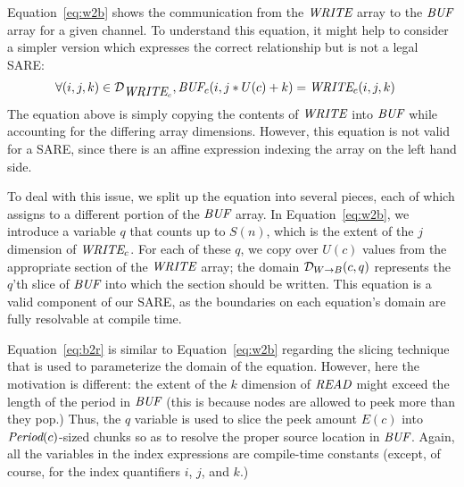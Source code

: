 Equation~\ref{eq:w2b} shows the communication from the $\mbox{\it WRITE}$
array to the $\mbox{\it BUF}$ array for a given channel.  To understand this
equation, it might help to consider a simpler version which expresses
the correct relationship but is not a legal SARE:
\begin{align*}
&\forall (i,j,k) \in {\cal D}_{\mbox{\it WRITE}_c},
\mbox{\it BUF}_{c}(i,j*U(c)+k) = \mbox{\it WRITE}_{c}(i, j, k)
\end{align*}
The equation above is simply copying the contents of $\mbox{\it WRITE}$ into
$\mbox{\it BUF}$ while accounting for the differing array dimensions.
However, this equation is not valid for a SARE, since there is an
affine expression indexing the array on the left hand side.

To deal with this issue, we split up the equation into several pieces,
each of which assigns to a different portion of the $\mbox{\it BUF}$ array.
In Equation~\ref{eq:w2b}, we introduce a variable $q$ that counts up
to $S(n)$, which is the extent of the $j$ dimension of $\mbox{\it WRITE}_c$.
For each of these $q$, we copy over $U(c)$ values from the appropriate
section of the $\mbox{\it WRITE}$ array; the domain ${\cal D}_{W \rightarrow
B}(c,q)$ represents the $q$'th slice of $\mbox{\it BUF}$ into which the
section should be written.  This equation is a valid component of our
SARE, as the boundaries on each equation's domain are fully resolvable
at compile time.

Equation~\ref{eq:b2r} is similar to Equation~\ref{eq:w2b} regarding
the slicing technique that is used to parameterize the domain of the
equation.  However, here the motivation is different: the extent of
the $k$ dimension of $\mbox{\it READ}$ might exceed the length of the period
in $\mbox{\it BUF}$ (this is because nodes are allowed to peek more than
they pop.)  Thus, the $q$ variable is used to slice the peek amount
$E(c)$ into $\mbox{\it Period}(c)$-sized chunks so as to resolve the proper
source location in $\mbox{\it BUF}$.  Again, all the variables in the index
expressions are compile-time constants (except, of course, for the
index quantifiers $i$, $j$, and $k$.)
